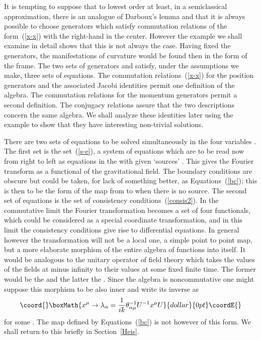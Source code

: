 \documentclass[12pt,a4paper]{article}
\def\kbar{{\mathchar'26\mkern-9muk}}
\begin{document}
It is tempting to suppose that to lowest order at least, in a
semiclassical approximation, there is an analogue of Darboux's lemma
and that it is always possible to choose generators which satisfy
commutation relations of the form~(\ref{x-x}) with the right-hand in
the center.  However the example we shall examine in detail shows that
this is not always the case. Having fixed the generators, the
manifestations of curvature would be found then in the form of the
frame. The two sets of generators \coordHE{} and \myHighlight{$\lambda_\alpha$}\coordHE{}
satisfy, under the assumptions we make, three sets of equations.  The
commutation relations~(\ref{x-x}) for the position generators \coordHE{}
and the associated Jacobi identities permit one definition of the
algebra. The commutation relations for the momentum generators permit
a second definition. The conjugacy relations assure that the two
descriptions concern the same algebra.  We shall analyze these
identities later using the example to show that they have interesting
non-trivial solutions.

There are two sets of equations to be solved simultaneously in the
four variables \myHighlight{$\lambda_\alpha$}\coordHE{}. The first set is the
set~(\ref{s-e}), a system of \coordHE{} equations which are
to be read now from right to left as equations in the \myHighlight{$\lambda_\alpha$}\coordHE{}
with given `sources' \coordHE{}. This gives the
Fourier transform as a functional of the gravitational field. The
boundary conditions are obscure but could be taken, for lack of
something better, as Equations~(\ref{bc}); this is then to be the form of
the map from \coordHE{} to \myHighlight{$\lambda_\alpha$}\coordHE{} when there is no source.
The second set of equations is the set of consistency
conditions~(\ref{consis2}). In the commutative limit the Fourier
transformation becomes a set of four functionals, which could be considered
as a special coordinate transformation, and in this limit the
consistency conditions give rise to differential equations. In general
however the transformation will not be a local one, a simple point to
point map, but a more elaborate morphism of the entire algebra of
functions into itself. It would be analogous to the unitary operator
of field theory which takes the values of the fields at minus infinity
to their values at some fixed finite time. The former would be the
\myHighlight{$\lambda_\alpha$}\coordHE{} and the latter the \coordHE{}. Since the algebra is
noncommutative one might suppose this morphism to be also inner and
write its inverse as
$$\coord{}\boxMath{
x^\mu \rightarrow \lambda_\alpha =
\frac{1}{i\kbar} \theta^{-1}_{\alpha\mu} U^{-1} x^\mu U 
}{dollar}{0pt}\coordE{}$$
for some \coordHE{}. The map defined by Equations~(\ref{bc}) is not however
of this form. We shall return to this briefly in Section~\ref{Heis}.
\end{document}
